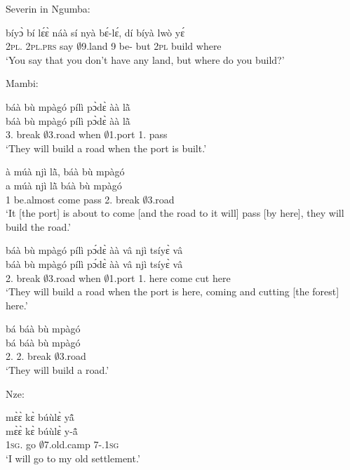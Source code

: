 \noindent Severin in Ngumba:

\begin{exe}[(C234)] 
\exC\label{193} 
  \gll bíyɔ̀ bí lɛ́ɛ̀ náà sí nyà bɛ́-lɛ́, dí bíyà lwò yɛ́ \\
        2\textsc{pl}.{\SBJ}  2\textsc{pl}.\textsc{prs} say {\COMP} $\emptyset$9.land 9 be-{\NEG} but 2\textsc{pl} build where  \\
    \trans `You say that you don't have any land, but where do you build?'
\end{exe}

\noindent Mambi:

\begin{exe}[(C234)]  
\exC\label{194} 
  \glll báà bù mpàgó pílì pɔ̀dɛ̀ àà lã̀ \\
      báà bù mpàgó pílì pɔ̀dɛ̀ àà lã̀ \\
        3.{\FUT} break  $\emptyset$3.road when $\emptyset$1.port 1.{\FUT} pass \\
    \trans `They will build a road when the port is built.'
 
\exC\label{195}
  \glll à múà njì lã̀, báà bù mpàgó \\
       a múà njì lã̀ báà bù mpàgó \\
        1 be.almost come pass 2.{\FUT} break $\emptyset$3.road  \\
    \trans `It [the port] is about to come [and the road to it will] pass [by here], they will build the road.'
 
\exC\label{196}
  \glll báà bù mpàgó pílì pɔ́dɛ̀ àà vâ njì tsíyɛ̀ vâ \\
      báà bù mpàgó pílì pɔ́dɛ̀ àà vâ njì tsíyɛ̀ vâ \\
         2.{\FUT} break $\emptyset$3.road when $\emptyset$1.port 1.{\COP} here come cut here \\
    \trans `They will build a road when the port is here, coming and cutting [the forest] here.'
 
\exC\label{197}
  \glll bá báà bù mpàgó \\
       bá báà bù mpàgó \\
        2.{\SBJ}  2.{\FUT} break $\emptyset$3.road  \\
    \trans `They will build a road.'
\end{exe}

\noindent Nze:

\begin{exe}[(C234)]  
\exC\label{198} 
  \glll mɛ̀ɛ̀ kɛ̀ búùlɛ̀ yã̂ \\
        mɛ̀ɛ̀ kɛ̀ búùlɛ̀ y-ã̂ \\
        1\textsc{sg}.{\FUT} go $\emptyset$7.old.camp 7-{\POSS}.1\textsc{sg}  \\
    \trans `I will go to my old settlement.'
\end{exe}


